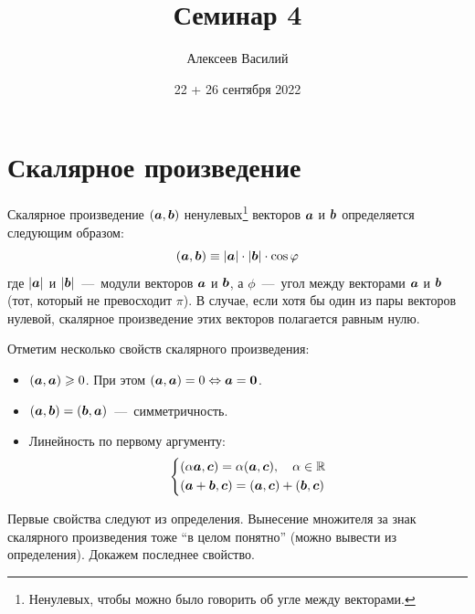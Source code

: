 \documentclass[a4paper,12pt]{article}
\author{Алексеев Василий}
\title{Семинар 4}
\date{22 + 26 сентября 2022}
\begin{document}
  \maketitle
  
  \tableofcontents

  \thispagestyle{empty}
  
  \newpage
  
  


  \section{Скалярное произведение}
  
  \begin{definition}
    Скалярное произведение $(\boldsymbol a, \boldsymbol b)$ ненулевых\footnote{Ненулевых, чтобы можно было говорить об угле между векторами.} векторов $\boldsymbol a$ и $\boldsymbol b$ определяется следующим образом:
    \begin{equation}
      (\boldsymbol a, \boldsymbol b) \equiv |\boldsymbol a| \cdot |\boldsymbol b| \cdot \cos \varphi
    \end{equation}
    где $|\boldsymbol a|$ и $|\boldsymbol b|$~---~модули векторов $\boldsymbol a$ и $\boldsymbol b$,
    а $\phi$~---~угол между векторами $\boldsymbol a$ и $\boldsymbol b$ (тот, который не превосходит $\pi$).
    В случае, если хотя бы один из пары векторов нулевой, скалярное произведение этих векторов полагается равным нулю.
  \end{definition}
  
  Отметим несколько свойств скалярного произведения:
  \begin{itemize}
    \item $(\boldsymbol a, \boldsymbol a) \geqslant 0$. При этом $(\bds a, \bds a) \hm= 0 \hm\Leftrightarrow \bds a \hm= \bds 0$.
    \item $(\boldsymbol a, \boldsymbol b) = (\boldsymbol b, \boldsymbol a)$~---~симметричность.
    \item Линейность по первому аргументу:
      \[
        \left\{
          \begin{aligned}
            &(\alpha \boldsymbol a, \boldsymbol c) = \alpha (\boldsymbol a, \boldsymbol c),\quad \alpha \in \operatorname{\mathbb R}\\
            &(\boldsymbol a + \boldsymbol b, \boldsymbol c) = (\boldsymbol a, \boldsymbol c) + (\boldsymbol b, \boldsymbol c)
          \end{aligned}
        \right.
      \]
  \end{itemize}
  
  Первые свойства следуют из определения.
  Вынесение множителя за знак скалярного произведения тоже ``в целом понятно'' (можно вывести из определения).
  Докажем последнее свойство.
  
\end{document}
